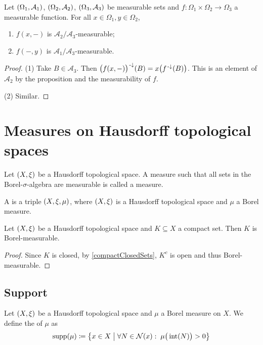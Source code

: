 \begin{corollary} \label{partialApplicationMeasurable}
Let $\sSet{\Omega_1, \mathcal{A}_1}$, $\sSet{\Omega_2, \mathcal{A}_2}$, $\sSet{\Omega_3, \mathcal{A}_3}$ be measurable sets and $f: \Omega_1\times\Omega_2 \to \Omega_3$ a measurable function. For all $x\in\Omega_1, y\in\Omega_2$,
\begin{enumerate}
\item $f(x,-)$ is $\mathcal{A}_2/\mathcal{A}_3$-measurable;
\item $f(-,y)$ is $\mathcal{A}_1/\mathcal{A}_3$-measurable.
\end{enumerate}
\end{corollary}
\begin{proof}
(1) Take $B\in \mathcal{A}_3$. Then $\big(f(x,-)\big)^{{\text{\hspace{0.15em}-}\downarrow}}(B) = x\big(f^{\text{\hspace{0.15em}-}\downarrow}(B)\big)$. This is an element of $\mathcal{A}_2$ by the proposition and the measurability of $f$.

(2) Similar.
\end{proof}

\section{Measures on Hausdorff topological spaces}
\begin{definition}
Let $\sSet{X, \xi}$ be a Hausdorff topological space. A measure such that all sets in the Borel-$\sigma$-algebra are measurable is called a  measure.

A  is a triple $\sSet{X,\xi, \mu}$, where $\sSet{X,\xi}$ is a Hausdorff topological space and $\mu$ a Borel measure.
\end{definition}

\begin{lemma} \label{compactsBorelMeasurable}
Let $\sSet{X, \xi}$ be a Hausdorff topological space and $K\subseteq X$ a compact set. Then $K$ is Borel-measurable.
\end{lemma}
\begin{proof}
Since $K$ is closed, by \ref{compactClosedSets}, $K^c$ is open and thus Borel-measurable.
\end{proof}

\subsection{Support}
\begin{definition}
Let $\sSet{X, \xi}$ be a Hausdorff topological space and $\mu$ a Borel measure on $X$. We define the  of $\mu$ as
\[ \supp(\mu) \defeq \setbuilder{x\in X}{\forall N\in \neighbourhoods(x): \; \mu\big(\interior(N)\big) > 0} \]
\end{definition}

